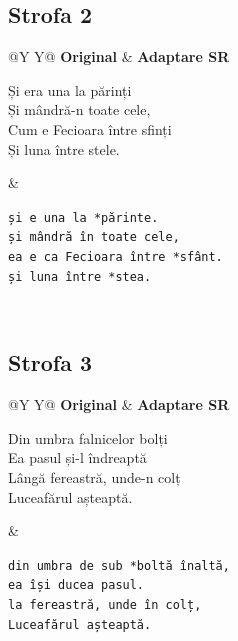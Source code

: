 \documentclass[12pt,onecolumn,letterpaper]{article}
\newcommand{\rs}[1]{\texttt{#1}}
\begin{document}
\subsection*{Strofa 2}
\noindent
\begin{tabularx}{\linewidth}{@{}Y Y@{}}
\textbf{Original} & \textbf{Adaptare SR} \\
\begin{minipage}[t]{\linewidth}\vspace{0pt}
Și era una la părinți\\
Și mândră-n toate cele,\\
Cum e Fecioara între sfinți\\
Și luna între stele.
\end{minipage}
&
\begin{minipage}[t]{\linewidth}\vspace{0pt}
\rs{și e una la *părinte.}\\
\rs{și mândră în toate cele,}\\
\rs{ea e ca Fecioara între *sfânt.}\\
\rs{și luna între *stea.}
\end{minipage}
\\
\end{tabularx}

\subsection*{Strofa 3}
\noindent
\begin{tabularx}{\linewidth}{@{}Y Y@{}}
\textbf{Original} & \textbf{Adaptare SR} \\
\begin{minipage}[t]{\linewidth}\vspace{0pt}
Din umbra falnicelor bolți\\
Ea pasul și-l îndreaptă\\
Lângă fereastră, unde-n colț\\
Luceafărul așteaptă.
\end{minipage}
&
\begin{minipage}[t]{\linewidth}\vspace{0pt}
\rs{din umbra de sub *boltă înaltă,}\\
\rs{ea își ducea pasul.}\\
\rs{la fereastră, unde în colț,}\\
\rs{Luceafărul așteaptă.}
\end{minipage}
\\
\end{tabularx}
\end{document}
